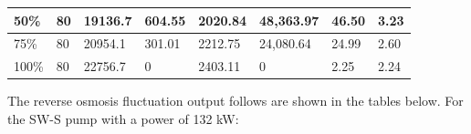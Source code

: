 \documentclass[12pt]{UIdahoMastersThesis}
\begin{document}
\begin{table}[h!]
\begin{tabular}{|l|l|l|l|l|l|l|l|}
50\%                                                                                                            & 80                                                                                                      & 19136.7                                                                                        & 604.55                                                       & 2020.84                                                                            & 48,363.97                                                                                & 46.50              & 3.23                                                               \\ \hline
75\%                                                                                                            & 80                                                                                                      & 20954.1                                                                                        & 301.01                                                       & 2212.75                                                                            & 24,080.64                                                                                & 24.99              & 2.60                                                               \\ \hline
100\%                                                                                                           & 80                                                                                                      & 22756.7                                                                                        & 0                                                            & 2403.11                                                                            & 0                                                                                        & 2.25               & 2.24                                                               \\ \hline
\end{tabular}
\end{table}

The reverse osmosis fluctuation output follows are shown in the tables below.  For the SW-S pump with a power of 132 kW:
\end{document}
